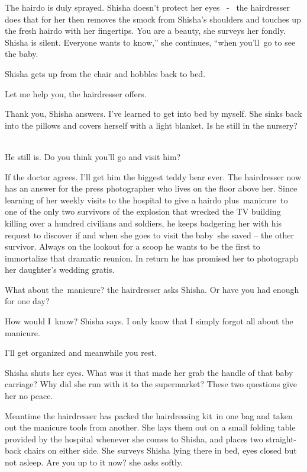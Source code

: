 \documentclass[12pt]{book}
\begin{document}
The hairdo is duly sprayed. Shisha doesn't protect{ }her eyes
\ {{}- }\ the hairdresser does that for her then removes the smock from
Shisha's shoulders and touches up the fresh hairdo with her fingertips. {\textquotedbl}You are a beauty,{\textquotedbl}
she surveys her fondly. Shisha is silent. {\textquotedbl}Everyone wants to know,'' she continues, ``when you'll~go to
see the baby.{\textquotedbl}

Shisha gets up from the chair and hobbles back to bed.

{\textquotedbl}Let me help you,{\textquotedbl} the hairdresser offers.

{\textquotedbl}Thank you,{\textquotedbl} Shisha answers. {\textquotedbl}I've learned to get into bed by
myself.{\textquotedbl} She sinks back into the pillows and covers herself with a light blanket. {\textquotedbl}Is he
still in the nursery?{\textquotedbl} \

{\textquotedbl}He still is. Do you think you'll go and visit him?{\textquotedbl}

{\textquotedbl}If the doctor agrees. I'll get him the biggest teddy bear ever.{\textquotedbl} The hairdresser now has an
answer for the press photographer who lives on the floor above her. Since learning of her weekly visits to the hospital
to give a hairdo plus~manicure~to one of the only two survivors of the explosion that wrecked the TV building killing
over a hundred civilians and soldiers, he keeps badgering her with his request to discover if and when she goes to
visit the baby~she saved -- the other survivor. Always on the lookout for a scoop he wants to be the first to
immortalize that dramatic reunion. In return he has promised her to photograph her daughter's wedding gratis.~

{\textquotedbl}What about the~manicure?{\textquotedbl} the hairdresser asks Shisha. {\textquotedbl}Or have you had
enough for one day?{\textquotedbl}

{\textquotedbl}How would I~know?{\textquotedbl} Shisha says. {\textquotedbl}I only know that I simply forgot all about
the manicure.{\textquotedbl}

{\textquotedbl}I'll get organized and meanwhile you rest.{\textquotedbl}

Shisha shuts her eyes. What was it that made her grab the handle of that baby carriage? Why did she run with it to the
supermarket? These two questions give her no peace.

Meantime the hairdresser has packed the hairdressing kit~in one bag and taken out the manicure tools from another. She
lays them out on a small folding table provided by the hospital whenever she comes to Shisha, and places two
straight-back chairs on either side. She surveys Shisha lying there in bed, eyes closed but not asleep.
{\textquotedbl}Are you up to it now?{\textquotedbl} she asks softly.
\end{document}
